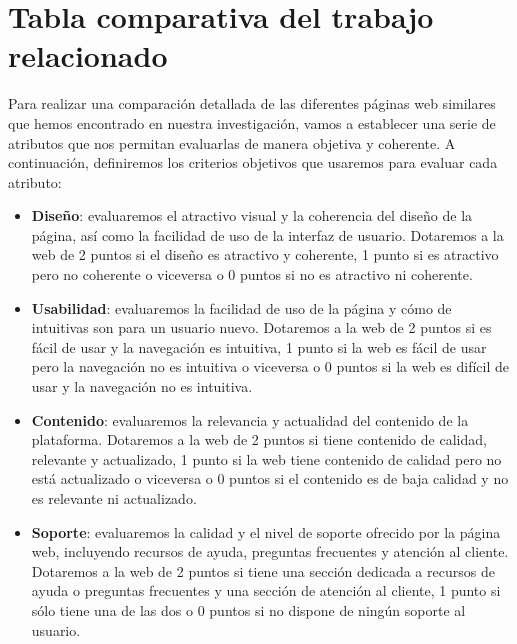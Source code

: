 
\section{Tabla comparativa del trabajo relacionado}\label{sec:comparativa-trabajo-relacionado}

Para realizar una comparación detallada de las diferentes páginas web similares que hemos encontrado en nuestra investigación, vamos a establecer una serie de atributos que nos permitan evaluarlas de manera objetiva y coherente. A continuación, definiremos los criterios objetivos que usaremos para evaluar cada atributo:

\begin{itemize}

	\item \textbf{Diseño}: evaluaremos el atractivo visual y la coherencia del diseño de la página, así como la facilidad de uso de la interfaz de usuario. Dotaremos a la web de 2 puntos si el diseño es atractivo y coherente, 1 punto si es atractivo pero no coherente o viceversa o 0 puntos si no es atractivo ni coherente.

	\item \textbf{Usabilidad}: evaluaremos la facilidad de uso de la página y cómo de intuitivas son para un usuario nuevo. Dotaremos a la web de 2 puntos si es fácil de usar y la navegación es intuitiva, 1 punto si la web es fácil de usar pero la navegación no es intuitiva o viceversa o 0 puntos si la web es difícil de usar y la navegación no es intuitiva.

	\item \textbf{Contenido}: evaluaremos la relevancia y actualidad del contenido de la plataforma. Dotaremos a la web de 2 puntos si tiene contenido de calidad, relevante y actualizado, 1 punto si la web tiene contenido de calidad pero no está actualizado o viceversa o 0 puntos si el contenido es de baja calidad y no es relevante ni actualizado.

	\item \textbf{Soporte}: evaluaremos la calidad y el nivel de soporte ofrecido por la página web, incluyendo recursos de ayuda, preguntas frecuentes y atención al cliente. Dotaremos a la web de 2 puntos si tiene una sección dedicada a recursos de ayuda o preguntas frecuentes y una sección de atención al cliente, 1 punto si sólo tiene una de las dos o 0 puntos si no dispone de ningún soporte al usuario.

\end{itemize}


